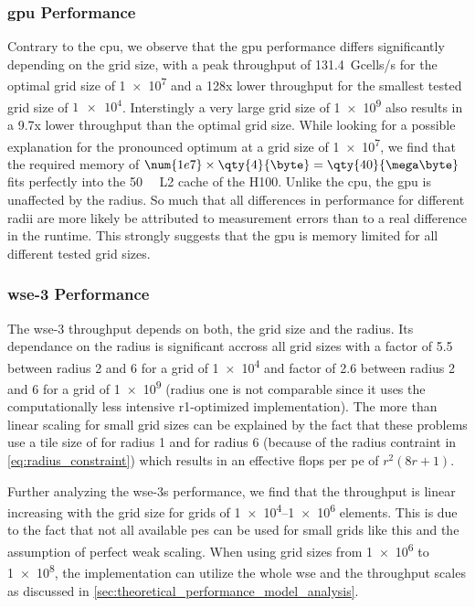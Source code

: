 \subsubsection{\ac{gpu} Performance}
Contrary to the \ac{cpu}, we observe that the \ac{gpu} performance differs significantly depending on the grid size, with a peak throughput of \qty{131.4}{Gcells/s} for the optimal grid size of \num{1e7} and a 128x lower throughput for the smallest tested grid size of $\num{1e4}$. Interstingly a very large grid size of \num{1e9} also results in a 9.7x lower throughput than the optimal grid size. While looking for a possible explanation for the pronounced optimum at a grid size of \num{1e7}, we find that the required memory of $\num{1e7}\times\qty{4}{\byte}=\qty{40}{\mega\byte}$ fits perfectly into the \qty{50}{\mega\byte} L2 cache of the H100.
Unlike the \ac{cpu}, the \ac{gpu} is unaffected by the radius. So much that all differences in performance for different radii are more likely be attributed to measurement errors than to a real difference in the runtime. This strongly suggests that the \ac{gpu} is memory limited for all different tested grid sizes.

\subsubsection{\ac{wse}-3 Performance}
The \ac{wse}-3 throughput depends on both, the grid size and the radius. Its dependance on the radius is significant accross all grid sizes with a factor of \num{5.5} between radius \num{2} and \num{6} for a grid of \num{1e4} and factor of \num{2.6} between radius \num{2} and \num{6} for a grid of \num{1e9} (radius one is not comparable since it uses the computationally less intensive r1-optimized implementation).
The more than linear scaling for small grid sizes can be explained by the fact that these problems use a tile size of  for radius \num{1} and  for radius \num{6} (because of the radius contraint in \autoref{eq:radius_constraint}) which results in an effective flops per \ac{pe} of $r^2(8r+1)$.

Further analyzing the \ac{wse}-3s performance, we find that the throughput is linear increasing with the grid size for grids of \numrange{1e4}{1e6} elements. This is due to the fact that not all available \acp{pe} can be used for small grids like this and the assumption of perfect weak scaling. When using grid sizes from \num{1e6} to \num{1e8}, the implementation can utilize the whole \ac{wse} and the throughput scales as discussed in \autoref{sec:theoretical_performance_model_analysis}.

